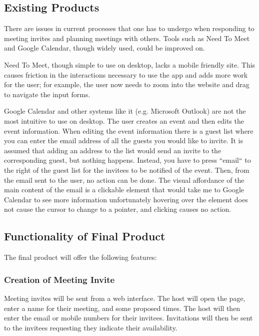 \documentclass{sigchi}
\begin{document}
\subsection{Existing Products}

There are issues in current processes that one has to undergo when responding to meeting invites and planning meetings with others. Tools such as Need To Meet and Google Calendar, though widely used, could be improved on.

Need To Meet, though simple to use on desktop, lacks a mobile friendly site. This causes friction in the interactions necessary to use the app and adds more work for the user; for example, the user now needs to zoom into the website and drag to navigate the input forms. 

Google Calendar and other systems like it (e.g. Microsoft Outlook) are not the most intuitive to use on desktop. The user creates an event and then edits the event information. When editing the event information there is a guest list where you can enter the email address of all the guests you would like to invite. It is assumed that adding an address to the list would send an invite to the corresponding guest, but nothing happens. Instead, you have to press ``email`` to the right of the guest list for the invitees to be notified of the event. Then, from the email sent to the user, no action can be done. The visual affordance of the main content of the email is a clickable element that would take me to Google Calendar to see more information \textemdash unfortunately hovering over the element does not cause the cursor to change to a pointer, and clicking causes no action. 


\subsection{Functionality of Final Product}

The final product will offer the following features:

\subsubsection{Creation of Meeting Invite}
Meeting invites will be sent from a web interface.
The host will open the page, enter a name for their meeting, and some proposed times.
The host will then enter the email or mobile numbers for their invitees.
Invitations will then be sent to the invitees requesting they indicate their availability.
\end{document}
